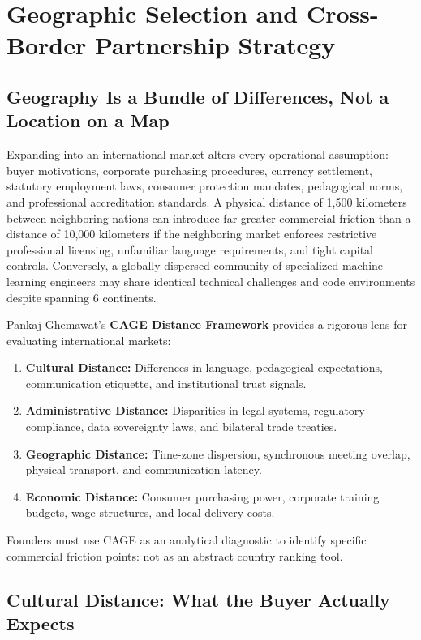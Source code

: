 \section{Geographic Selection and Cross-Border Partnership Strategy}
\label{sec:ch30_cross_border_market_selection}

\subsection{Geography Is a Bundle of Differences, Not a Location on a Map}
\label{sec:geography_bundle_of_differences}

Expanding into an international market alters every operational assumption: buyer motivations, corporate purchasing procedures, currency settlement, statutory employment laws, consumer protection mandates, pedagogical norms, and professional accreditation standards. A physical distance of 1,500 kilometers between neighboring nations can introduce far greater commercial friction than a distance of 10,000 kilometers if the neighboring market enforces restrictive professional licensing, unfamiliar language requirements, and tight capital controls. Conversely, a globally dispersed community of specialized machine learning engineers may share identical technical challenges and code environments despite spanning 6 continents.

Pankaj Ghemawat's \textbf{CAGE Distance Framework} provides a rigorous lens for evaluating international markets:
\begin{enumerate}
\item \textbf{Cultural Distance:} Differences in language, pedagogical expectations, communication etiquette, and institutional trust signals.
\item \textbf{Administrative Distance:} Disparities in legal systems, regulatory compliance, data sovereignty laws, and bilateral trade treaties.
\item \textbf{Geographic Distance:} Time-zone dispersion, synchronous meeting overlap, physical transport, and communication latency.
\item \textbf{Economic Distance:} Consumer purchasing power, corporate training budgets, wage structures, and local delivery costs.
\end{enumerate}
Founders must use CAGE as an analytical diagnostic to identify specific commercial friction points: not as an abstract country ranking tool.

\subsection{Cultural Distance: What the Buyer Actually Expects}
\label{sec:cultural_distance_buyer_expectations}

